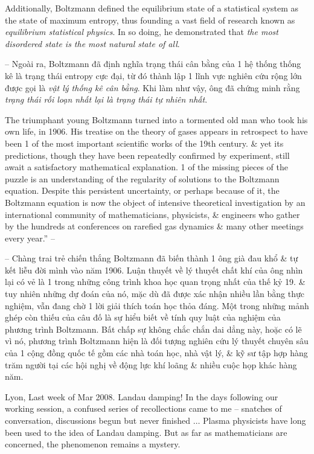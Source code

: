 \documentclass{article}
\begin{document}
\begin{enumerate}
	Additionally, Boltzmann defined the equilibrium state of a statistical system as the state of maximum entropy, thus founding a vast field of research known as {\it equilibrium statistical physics}. In so doing, he demonstrated that {\it the most disordered state is the most natural state of all}.

	-- Ngoài ra, Boltzmann đã định nghĩa trạng thái cân bằng của 1 hệ thống thống kê là trạng thái entropy cực đại, từ đó thành lập 1 lĩnh vực nghiên cứu rộng lớn được gọi là {\it vật lý thống kê cân bằng}. Khi làm như vậy, ông đã chứng minh rằng {\it trạng thái rối loạn nhất lại là trạng thái tự nhiên nhất}.

	The triumphant young Boltzmann turned into a tormented old man who took his own life, in 1906. His treatise on the theory of gases appears in retrospect to have been 1 of the most important scientific works of the 19th century. \& yet its predictions, though they have been repeatedly confirmed by experiment, still await a satisfactory mathematical explanation. 1 of the missing pieces of the puzzle is an understanding of the regularity of solutions to the Boltzmann equation. Despite this persistent uncertainty, or perhaps because of it, the Boltzmann equation is now the object of intensive theoretical investigation by an international community of mathematicians, physicists, \& engineers who gather by the hundreds at conferences on rarefied gas dynamics \& many other meetings every year.'' -- \cite[pp. 3--9]{Villani2015}

	-- Chàng trai trẻ chiến thắng Boltzmann đã biến thành 1 ông già đau khổ \& tự kết liễu đời mình vào năm 1906. Luận thuyết về lý thuyết chất khí của ông nhìn lại có vẻ là 1 trong những công trình khoa học quan trọng nhất của thế kỷ 19. \& tuy nhiên những dự đoán của nó, mặc dù đã được xác nhận nhiều lần bằng thực nghiệm, vẫn đang chờ 1 lời giải thích toán học thỏa đáng. Một trong những mảnh ghép còn thiếu của câu đố là sự hiểu biết về tính quy luật của nghiệm của phương trình Boltzmann. Bất chấp sự không chắc chắn dai dẳng này, hoặc có lẽ vì nó, phương trình Boltzmann hiện là đối tượng nghiên cứu lý thuyết chuyên sâu của 1 cộng đồng quốc tế gồm các nhà toán học, nhà vật lý, \& kỹ sư tập hợp hàng trăm người tại các hội nghị về động lực khí loãng \& nhiều cuộc họp khác hàng năm.

	 Lyon, Last week of Mar 2008. Landau damping! In the days following our working session, a confused series of recollections came to me -- snatches of conversation, discussions begun but never finished $\ldots$ Plasma physicists have long been used to the idea of Landau damping. But as far as mathematicians are concerned, the phenomenon remains a mystery.


\end{enumerate}
\end{document}
